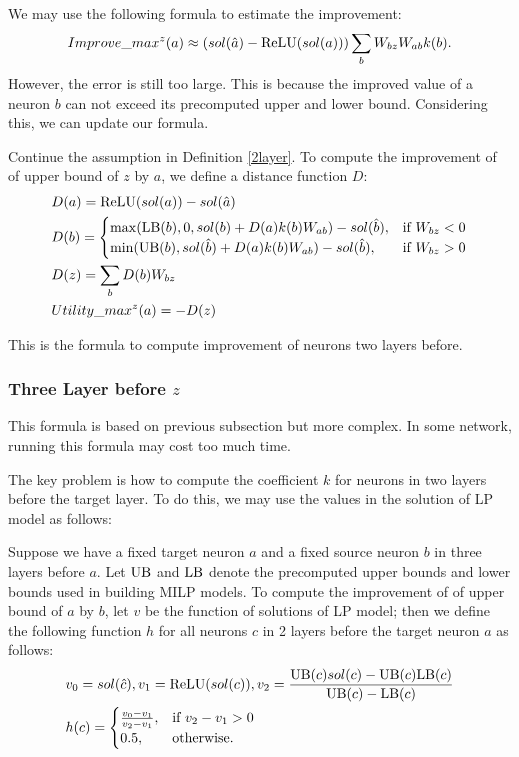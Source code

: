 We may use the following formula to estimate the improvement:  \begin{align*}
	Improve\_max^z(a) \approx (sol(\hat{a})-\mathrm{ReLU}(sol(a)))\sum_b W_{bz}W_{ab}k(b).
\end{align*}However, the error is still too large. This is because the improved value of a neuron $b$ can not exceed its precomputed upper and lower bound. Considering this, we can update our formula.

\begin{definition}
	Continue the assumption in Definition \ref{2layer}. To compute the improvement of of upper bound of $z$ by $a$, we define a distance function $D$:
	\begin{align}
		&D(a) = \mathrm{ReLU}(sol(a))-sol(\hat{a})\\
			&D(b) =
		\begin{cases}
			\max(\mathrm{LB}(b), 0, sol(b)+D(a)k(b)W_{ab})-sol(\hat{b}), & \text{if }W_{bz} < 0\\
			\min(\mathrm{UB}(b), sol(\hat{b})+D(a)k(b)W_{ab})-sol(\hat{b}), & \text{if }  W_{bz} > 0
		\end{cases}\\
		&D(z) = \sum_b D(b)W_{bz}\\
		&Utility\_max^z(a) = -D(z)
	\end{align}
\end{definition}
 This is the formula to compute improvement of neurons two layers before.


\subsubsection*{Three Layer before  $z$} 

This formula is based on previous subsection but more complex. In some network, running this formula may cost too much time. 

The key problem is how to compute the coefficient $k$ for neurons in two layers before the target layer. To do this, we may use the values in the solution of LP model as follows:

\begin{definition}\label{3layer}
	Suppose we have a fixed target neuron $a$ and a fixed source neuron $b$ in three layers before $a$. Let $\mathrm{UB}$ and $\mathrm{LB}$ denote the precomputed upper bounds and lower bounds used in building MILP models. To compute the improvement of of upper bound of $a$ by $b$, let $v$ be the function of solutions of LP model; then we define the following function $h$ for all neurons $c$ in 2 layers before the target neuron $a$ as follows:
	\begin{align}
		&v_0 = sol(\hat{c}), v_1 = \mathrm{ReLU}(sol(c)), v_2 = \frac{\mathrm{UB}(c)sol(c)-\mathrm{UB}(c)\mathrm{LB}(c)}{\mathrm{UB}(c)-\mathrm{LB}(c)}\\
		&h(c) =
		\begin{cases}
			\frac{v_0-v_1}{v_2-v_1}, & \text{if } v_2-v_1 > 0\\
			0.5, & \text{otherwise.}
		\end{cases}
	\end{align} 
\end{definition} 

